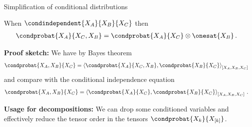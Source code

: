 \documentclass{beamer}
\begin{document}
    \begin{frame}{Simplification of conditional distributions}

        \begin{theorem}
            When $\condindependent{\catvariableof{\nodesa}}{\catvariableof{\nodesb}}{\catvariableof{\nodesc}}$ then %
            \begin{align*}
                \condprobat{\catvariableof{\nodesa}}{\catvariableof{\nodesc},\catvariableof{\nodesb}}
                = \condprobat{\catvariableof{\nodesa}}{\catvariableof{\nodesc}} \otimes \onesat{\catvariableof{\nodesb}} \, .
            \end{align*}
        \end{theorem}

            {\bf Proof sketch:} We have by Bayes theorem
        \begin{align*}
            \condprobat{\catvariableof{\nodesa},\catvariableof{\nodesb}}{\catvariableof{\nodesc}}
            = \contractionof{
                \condprobat{\catvariableof{\nodesa}}{\catvariableof{\nodesc},\catvariableof{\nodesb}},
                \condprobat{\catvariableof{\nodesb}}{\catvariableof{\nodesc}}
            }{\catvariableof{\nodesa},\catvariableof{\nodesb},\catvariableof{\nodesc}}
        \end{align*}
        and compare with the conditional independence equation
        \begin{align*}
            \condprobat{\catvariableof{\nodesa},\catvariableof{\nodesb}}{\catvariableof{\nodesc}}
            = \contractionof{
                \condprobat{\catvariableof{\nodesa}}{\catvariableof{\nodesc}},
                \condprobat{\catvariableof{\nodesb}}{\catvariableof{\nodesc}}
            }{\catvariableof{\nodesa},\catvariableof{\nodesb},\catvariableof{\nodesc}} \, .
        \end{align*}
        \par
        {\bf Usage for decompositions:} We can drop some conditioned variables and effectively reduce the tensor order in the tensors $\condprobat{\catvariableof{\catenumerator}}{\catvariableof{[\catenumerator]}}$.
    \end{frame}
\end{document}
